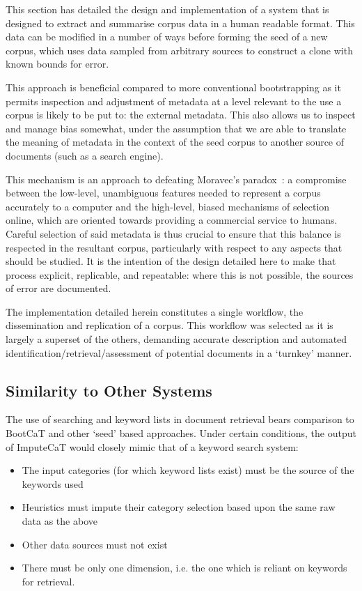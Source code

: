 

This section has detailed the design and implementation of a system that is designed to extract and summarise corpus data in a human readable format.  This data can be modified in a number of ways before forming the seed of a new corpus, which uses data sampled from arbitrary sources to construct a clone with known bounds for error.

This approach is beneficial compared to more conventional bootstrapping as it permits inspection and adjustment of metadata at a level relevant to the use a corpus is likely to be put to: the external metadata.  This also allows us to inspect and manage bias somewhat, under the assumption that we are able to translate the meaning of metadata in the context of the seed corpus to another source of documents (such as a search engine).

This mechanism is an approach to defeating Moravec's paradox~\cite{moravec1988mind}: a compromise between the low-level, unambiguous features needed to represent a corpus accurately to a computer and the high-level, biased mechanisms of selection online, which are oriented towards providing a commercial service to humans.  Careful selection of said metadata is thus crucial to ensure that this balance is respected in the resultant corpus, particularly with respect to any aspects that should be studied.  It is the intention of the design detailed here to make that process explicit, replicable, and repeatable: where this is not possible, the sources of error are documented.

The implementation detailed herein constitutes a single workflow, the dissemination and replication of a corpus.  This workflow was selected as it is largely a superset of the others, demanding accurate description and automated identification/retrieval/assessment of potential documents in a `turnkey' manner.


\subsection{Similarity to Other Systems}
The use of searching and keyword lists in document retrieval bears comparison to BootCaT and other `seed' based approaches.  Under certain conditions, the output of ImputeCaT would closely mimic that of a keyword search system:

\begin{itemize}
    \item The input categories (for which keyword lists exist) must be the source of the keywords used
    \item Heuristics must impute their category selection based upon the same raw data as the above
    \item Other data sources must not exist
    \item There must be only one dimension, i.e. the one which is reliant on keywords for retrieval.
\end{itemize}

